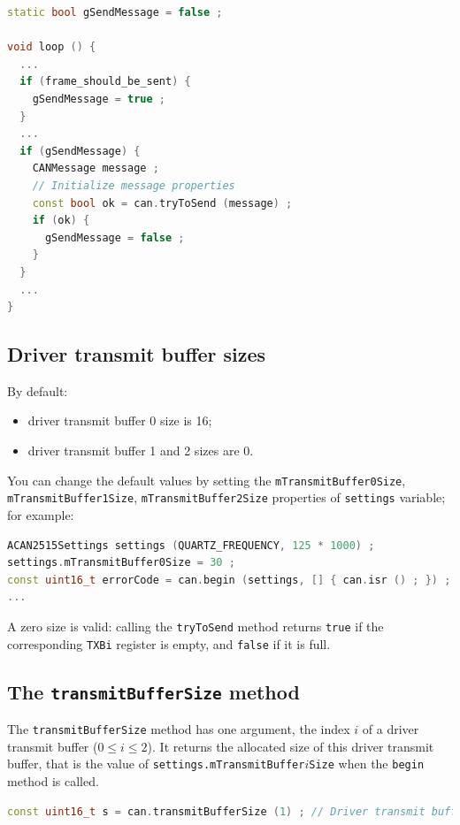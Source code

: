 \documentclass[9pt, a4paper, obeyspaces]{extarticle}
\newcommand \subsectionLabel[2]{\subsection{#1}\label{subsec:#2}}
\begin{document}
{ \small
  \begin{lstlisting}[language=c++]
static bool gSendMessage = false ;

void loop () {
  ...
  if (frame_should_be_sent) {
    gSendMessage = true ;
  }
  ...
  if (gSendMessage) {
    CANMessage message ;
    // Initialize message properties
    const bool ok = can.tryToSend (message) ;
    if (ok) {
      gSendMessage = false ;
    }
  }
  ...
}
  \end{lstlisting}
}


\subsectionLabel{Driver transmit buffer sizes}{driverTransmitBufferSize}

By default:
\begin{itemize}
  \item driver transmit buffer 0 size is 16;
  \item driver transmit buffer 1 and 2 sizes are 0.
\end{itemize}

You can change the default values by setting the \texttt{mTransmitBuffer0Size}, \texttt{mTransmitBuffer1Size}, \texttt{mTransmitBuffer2Size} properties of \texttt{settings} variable; for example:

{ \small\begin{lstlisting}[language=c++]
ACAN2515Settings settings (QUARTZ_FREQUENCY, 125 * 1000) ;
settings.mTransmitBuffer0Size = 30 ;
const uint16_t errorCode = can.begin (settings, [] { can.isr () ; }) ;
...
\end{lstlisting}}

A zero size is valid: calling the \texttt{tryToSend} method returns \texttt{true} if the corresponding \texttt{TXBi} register is empty, and \texttt{false} if it is full.



\subsection{The \texttt{transmitBufferSize} method}

The \texttt{transmitBufferSize} method has one argument, the index $i$ of a driver transmit buffer ($0 \leqslant i \leqslant 2$). It returns the allocated size of this driver transmit buffer, that is the value of \texttt{settings.mTransmitBuffer$i$Size} when the \texttt{begin} method is called.
{ \small\begin{lstlisting}[language=c++]
const uint16_t s = can.transmitBufferSize (1) ; // Driver transmit buffer 1
\end{lstlisting}}
\end{document}
